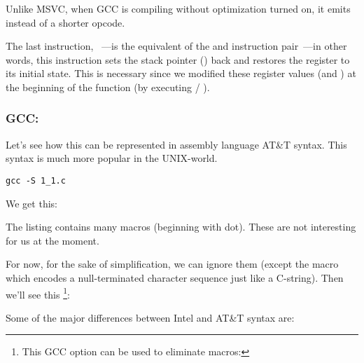 Unlike MSVC, when GCC is compiling without optimization turned on, it emits  instead of a shorter opcode.

The last instruction, \LEAVE~---is the equivalent of the  and  instruction pair~---in other words, this instruction sets the \gls{stack pointer} (\ESP) back and restores the \EBP register to its initial state.
This is necessary since we modified these register values (\ESP and \EBP) at the beginning of the function (by executing  / ).

\subsubsection{GCC: \ATTSyntax}
\label{ATT_syntax}

Let's see how this can be represented in assembly language AT\&T syntax.
This syntax is much more popular in the UNIX-world.

\begin{lstlisting}[caption=let's compile in GCC 4.7.3]
gcc -S 1_1.c
\end{lstlisting}

We get this:



The listing contains many macros (beginning with dot). These are not interesting for us at the moment.

For now, for the sake of simplification, we can ignore them (except the  macro which
encodes a null-terminated character sequence just like a C-string). Then we'll see this
\footnote{This GCC option can be used to eliminate  macros: }:



\myindex{\ATTSyntax}
\myindex{\IntelSyntax}
Some of the major differences between Intel and AT\&T syntax are:

